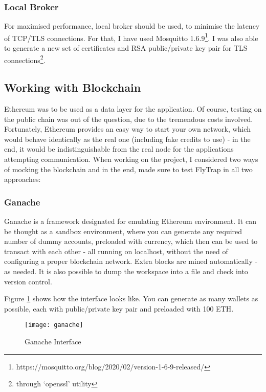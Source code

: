 \subsubsection{Local Broker}
For maximised performance, local broker should be used, to minimise the latency of TCP/TLS connections. For that, I have used Mosquitto 1.6.9\footnote{https://mosquitto.org/blog/2020/02/version-1-6-9-released/}. I was also able to generate a new set of certificates and RSA public/private key pair for TLS connections\footnote{through `openssl' utility}.  
\subsection{Working with Blockchain}
Ethereum was to be used as a data layer for the application. Of course, testing on the public chain was out of the question, due to the tremendous costs involved. Fortunately, Ethereum provides an easy way to start your own network, which would behave identically as the real one (including fake credits to use) - in the end, it would be indistinguishable from the real node for the applications attempting communication. When working on the project, I considered two ways of mocking the blockchain and in the end, made sure to test FlyTrap in all two approaches:
\subsubsection{Ganache}
Ganache\cite{lee2019testing} is a framework designated for emulating Ethereum environment. It can be thought as a sandbox environment, where you can generate any required number of dummy accounts, preloaded with currency, which then can be used to transact with each other - all running on localhost, without the need of configuring a proper blockchain network. Extra blocks are mined automatically - as needed. It is also possible to dump the workspace into a file and check into version control.

Figure \ref{fig:ganache} shows how the interface looks like. You can generate as many wallets as possible, each with public/private key pair and preloaded with 100 ETH.
\begin{figure}[h]
    \centering
    \texttt{[image: ganache]}
    \caption{Ganache Interface}
    \label{fig:ganache}
\end{figure}

